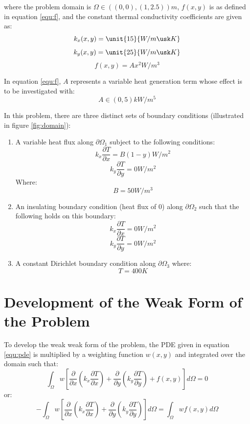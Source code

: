 \documentclass[letterpaper,10pt]{article}
\begin{document}
\noindent where the problem domain is $\Omega \in \unit{\left(\left(0,0\right),\left(1,2.5\right)\right)}{m}$, $f(x,y)$ is as defined in equation \ref{equ:f}, and the constant thermal conductivity coefficients are given as:
\[k_x(x,y)=\unit{15}{W/m\usk K}\]
\[k_y(x,y)=\unit{25}{W/m\usk K}\]
\begin{equation}
\label{equ:f}
f(x,y) = Ax^2 \unit{}{W/m^3}
\end{equation}

\noindent In equation \ref{equ:f}, $A$ represents a variable heat generation term whose effect is to be investigated with:
\[A \in \unit{(0, 5)}{kW/m^5}\]

\noindent In this problem, there are three distinct sets of boundary conditions (illustrated in figure \ref{fig:domain}):
\begin{enumerate}
	\item A variable heat flux along $\partial \Omega_1$ subject to the following conditions:
	\[k_x\frac{\partial T}{\partial x} = B \left(1-y\right) \unit{}{W/m^2}\]
	\[k_y\frac{\partial T}{\partial y} = 0 \unit{}{W/m^2}\]
	Where:
	\[B = \unit{50}{W/m^3}\]
	
	\item An insulating boundary condition (heat flux of 0) along $\partial \Omega_2$ such that the following holds on this boundary:
	\[k_x\frac{\partial T}{\partial x} = 0 \unit{}{W/m^2}\]
	\[k_y\frac{\partial T}{\partial y} = 0 \unit{}{W/m^2}\]
	
	\item A constant Dirichlet boundary condition along $\partial \Omega_3$ where:
	\[T = \unit{400}{K}\]
\end{enumerate}

\section{Development of the Weak Form of the Problem}
To develop the weak weak form of the problem, the PDE given in equation \ref{equ:pde} is multiplied by a weighting function $w(x,y)$ and integrated over the domain such that:
\[\int_\Omega w \left[\frac{\partial}{\partial x}\left(k_x\frac{\partial T}{\partial x}\right) + \frac{\partial}{\partial y}\left(k_y\frac{\partial T}{\partial y}\right) + f(x,y)\right] d\Omega = 0\]
\noindent or:
\begin{equation}
\label{equ:wintpde}
-\int_\Omega w \left[\frac{\partial}{\partial x}\left(k_x\frac{\partial T}{\partial x}\right) + \frac{\partial}{\partial y}\left(k_y\frac{\partial T}{\partial y}\right)\right] d\Omega = \int_\Omega wf(x,y)d\Omega
\end{equation}
\end{document}
